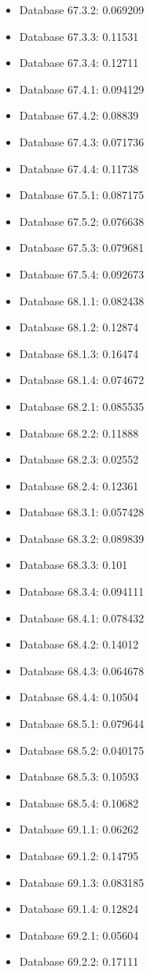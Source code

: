 \begin{itemize}
\item Database 67.3.2: 0.069209
\item Database 67.3.3: 0.11531
\item Database 67.3.4: 0.12711
\item Database 67.4.1: 0.094129
\item Database 67.4.2: 0.08839
\item Database 67.4.3: 0.071736
\item Database 67.4.4: 0.11738
\item Database 67.5.1: 0.087175
\item Database 67.5.2: 0.076638
\item Database 67.5.3: 0.079681
\item Database 67.5.4: 0.092673
\item Database 68.1.1: 0.082438
\item Database 68.1.2: 0.12874
\item Database 68.1.3: 0.16474
\item Database 68.1.4: 0.074672
\item Database 68.2.1: 0.085535
\item Database 68.2.2: 0.11888
\item Database 68.2.3: 0.02552
\item Database 68.2.4: 0.12361
\item Database 68.3.1: 0.057428
\item Database 68.3.2: 0.089839
\item Database 68.3.3: 0.101
\item Database 68.3.4: 0.094111
\item Database 68.4.1: 0.078432
\item Database 68.4.2: 0.14012
\item Database 68.4.3: 0.064678
\item Database 68.4.4: 0.10504
\item Database 68.5.1: 0.079644
\item Database 68.5.2: 0.040175
\item Database 68.5.3: 0.10593
\item Database 68.5.4: 0.10682
\item Database 69.1.1: 0.06262
\item Database 69.1.2: 0.14795
\item Database 69.1.3: 0.083185
\item Database 69.1.4: 0.12824
\item Database 69.2.1: 0.05604
\item Database 69.2.2: 0.17111

\end{itemize}

